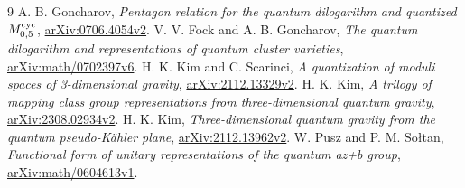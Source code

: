 \documentclass[11pt,a4paper]{article}
\begin{document}
\begin{thebibliography}{9}\small
{} A. B. Goncharov,
\emph{Pentagon relation for the quantum dilogarithm and quantized
$M_{0,5}^{\rm cyc}$}, \href{https://arxiv.org/abs/0706.4054v2}{arXiv:0706.4054v2}.
 V. V. Fock and A. B. Goncharov,
\emph{The quantum dilogarithm and representations of quantum cluster varieties},
\href{https://arxiv.org/abs/math/0702397v6}{arXiv:math/0702397v6}.
 H. K. Kim and C. Scarinci,
\emph{A quantization of moduli spaces of 3-dimensional gravity},
\href{https://arxiv.org/abs/2112.13329v2}{arXiv:2112.13329v2}.
 H. K. Kim,
\emph{A trilogy of mapping class group representations from
three-dimensional quantum gravity},
\href{https://arxiv.org/abs/2308.02934v2}{arXiv:2308.02934v2}.
 H. K. Kim,
\emph{Three-dimensional quantum gravity from the quantum pseudo-K\"ahler plane},
\href{https://arxiv.org/abs/2112.13962v2}{arXiv:2112.13962v2}.
 W. Pusz and P. M. So{\l}tan,
\emph{Functional form of unitary representations of the quantum az+b group},
\href{https://arxiv.org/abs/math/0604613v1}{arXiv:math/0604613v1}.
\end{thebibliography}
\end{document}
